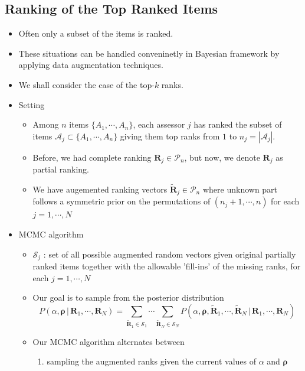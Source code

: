 \documentclass[12pt]{article}
\begin{document}
\subsection{Ranking of the Top Ranked Items}
\begin{itemize}
    \item Often only a subset of the items is ranked.
    \item These situations can be handled conveninetly in Bayesian framework by applying data augmentation techniques.
    \item We shall consider the case of the top-$k$ ranks.
    \item Setting 
    \begin{itemize}
        \item Among $n$ items $\{A_1, \cdots, A_n\}$, each assessor $j$ has ranked the subset of items $\mathcal{A}_j\subset\{A_1, \cdots, A_n\}$ giving them top ranks from $1$ to $n_j=|\mathcal{A}_j|$. 
        \item Before, we had complete ranking $\mathbf{R}_j\in \mathcal{P}_n$, but now, we denote $\mathbf{R}_j$ as partial ranking.
        \item We have augemented ranking vectors $\tilde{\mathbf{R}}_j\in \mathcal{P}_n$ where unknown part follows a symmetric prior on the permutations of $(n_j+1, \cdots, n)$ for each $j=1, \cdots, N$
    \end{itemize}
    \item MCMC algorithm
    \begin{itemize}
        \item $\mathcal{S}_j$ : set of all possible augmented random vectors given original partially ranked items together with the allowable 'fill-ins' of the missing ranks, for each $j=1, \cdots, N$
        \item Our goal is to sample from the posterior distribution \begin{equation*}
            P(\alpha, \boldsymbol{\rho}\, |\, \mathbf{R}_1, \cdots, \mathbf{R}_N)=\sum_{\tilde{\mathbf{R}}_1\in \mathcal{S}_1}\cdots \sum_{\tilde{\mathbf{R}}_N\in \mathcal{S}_N}P(\alpha, \boldsymbol{\rho}, \tilde{\mathbf{R}}_1, \cdots,\tilde{\mathbf{R}}_N\, |\, \mathbf{R}_1, \cdots, \mathbf{R}_N )
        \end{equation*}
        \item Our MCMC algorithm alternates between
        \begin{enumerate}
            \item  sampling the augmented ranks given the current values of $\alpha$ and $\boldsymbol{\rho}$

\end{enumerate}
\end{itemize}
\end{itemize}
\end{document}

